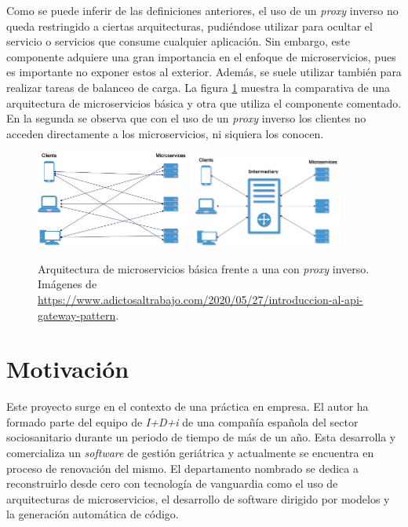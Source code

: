\documentclass[11pt,spanish,listoffigures]{tfgetsinf}
\begin{document}
Como se puede inferir de las definiciones anteriores, el uso de un \emph{proxy} inverso no queda restringido a ciertas arquitecturas, pudiéndose utilizar para ocultar el servicio o servicios que consume cualquier aplicación. Sin embargo, este componente adquiere una gran importancia en el enfoque de microservicios, pues es importante no exponer estos al exterior. Además, se suele utilizar también para realizar tareas de balanceo de carga. La figura \ref{figura:proxyInverso_o_no} muestra la comparativa de una arquitectura de microservicios básica y otra que utiliza el componente comentado. En la segunda se observa que con el uso de un \emph{proxy} inverso los clientes no acceden directamente a los microservicios, ni siquiera los conocen.

\begin{figure}[ht]
\centering
\label{figura:proxyInverso_o_no}
\includegraphics[width=0.45\textwidth]{images/arquitecturaMicroserviciosBasica}
\includegraphics[width=0.45\textwidth]{images/arquitecturaMicroserviciosConProxyInverso}
\caption{Arquitectura de microservicios básica frente a una con \emph{proxy} inverso. Imágenes de \url{https://www.adictosaltrabajo.com/2020/05/27/introduccion-al-api-gateway-pattern}.}
\end{figure}

\section{Motivación}

Este proyecto surge en el contexto de una práctica en empresa. El autor ha formado parte del equipo de \emph{I+D+i} de una compañía española del sector sociosanitario durante un periodo de tiempo de más de un año. Esta desarrolla y comercializa un \emph{software} de gestión geriátrica y actualmente se encuentra en proceso de renovación del mismo. El departamento nombrado se dedica a reconstruirlo desde cero con tecnología de vanguardia como el uso de arquitecturas de microservicios, el desarrollo de software dirigido por modelos y la generación automática de código.
\end{document}
